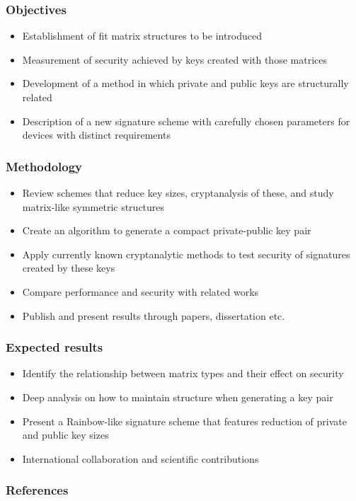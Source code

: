\documentclass[12pt]{beamer}
\newcommand{\backupbegin}{
  \newcounter{framenumberappendix}
  \setcounter{framenumberappendix}{\value{framenumber}}
}
\newcommand{\backupend}{
  \addtocounter{framenumberappendix}{-\value{framenumber}}
  \addtocounter{framenumber}{\value{framenumberappendix}}
}
\begin{document}
\begin{frame}
  \frametitle{Objectives}
  \begin{itemize}
    \item Establishment of fit matrix structures to be introduced
    \item Measurement of security achieved by keys created with those matrices
    \item Development of a method in which private and public keys are
        structurally related
    \item Description of a new signature scheme with carefully chosen
        parameters for devices with distinct requirements
  \end{itemize}
\end{frame}

\begin{frame}
  \frametitle{Methodology}
  \begin{itemize}
    \item Review schemes that reduce key sizes, cryptanalysis of these, and
        study matrix-like symmetric structures
    \item Create an algorithm to generate a compact private-public key
        pair
    \item Apply currently known cryptanalytic methods to test security of
        signatures created by these keys
    \item Compare performance and security with related works
    \item Publish and present results through papers, dissertation etc.
  \end{itemize}
\end{frame}

\begin{frame}
  \frametitle{Expected results}
  \begin{itemize}
    \item Identify the relationship between matrix types and their effect on
        security
    \item Deep analysis on how to maintain structure when generating a key pair
    \item Present a Rainbow-like signature scheme that features reduction of
        private and public key sizes
    \item International collaboration and scientific contributions
  \end{itemize}
\end{frame}

\backupbegin{}
\begin{frame}
  \frametitle{References}
  
  {\tiny }
\end{frame}
\backupend{}
\end{document}
